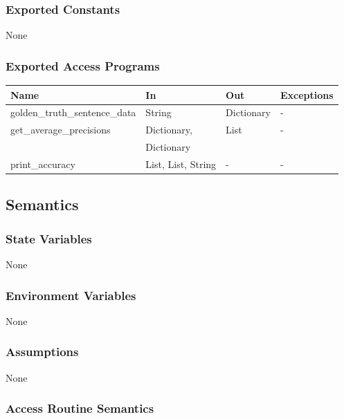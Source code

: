 \documentclass[12pt, titlepage]{article}
\begin{document}
\subsubsection{Exported Constants}

None 


\subsubsection{Exported Access Programs}

\begin{center}
\begin{tabular}{p{5.5cm} p{3cm} p{2.5cm} p{2cm}}
\hline
\textbf{Name} & \textbf{In} & \textbf{Out} & \textbf{Exceptions} \\
\hline
golden\_truth\_sentence\_data & String & Dictionary & - \\
get\_average\_precisions & Dictionary,  & List & - \\
 & Dictionary  &  &  \\
print\_accuracy & List, List, String & - & - \\
\hline
\end{tabular}
\end{center}

\subsection{Semantics}

\subsubsection{State Variables}

None

\subsubsection{Environment Variables}

None

\subsubsection{Assumptions}

None


\subsubsection{Access Routine Semantics}
\end{document}

